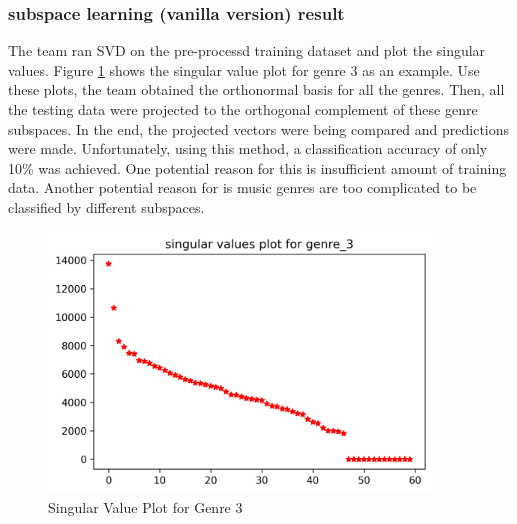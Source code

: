 \subsubsection{subspace learning (vanilla version) result}
    \begin{par}
        \par \hspace{15pt} The team ran SVD on the pre-processd training dataset and plot the singular values. Figure \ref{fig:svd} shows the singular value plot for genre 3 as an example. Use these plots, the team obtained the orthonormal basis for all the genres. Then, all the testing data were projected to the orthogonal complement of these genre subspaces. In the end, the projected vectors were being compared and predictions were made. Unfortunately, using this method, a classification accuracy of only 10\% was achieved. One potential reason for this is insufficient amount of training data. Another potential reason for is music genres are too complicated to be classified by different subspaces.
    \end{par}
    
    \begin{par}
    \begin{figure}[H]
        \centering
        \includegraphics[width=4in]{image/s3_plot.png}
        \caption{Singular Value Plot for Genre 3}
        \label{fig:svd}
    \end{figure}
    \end{par}